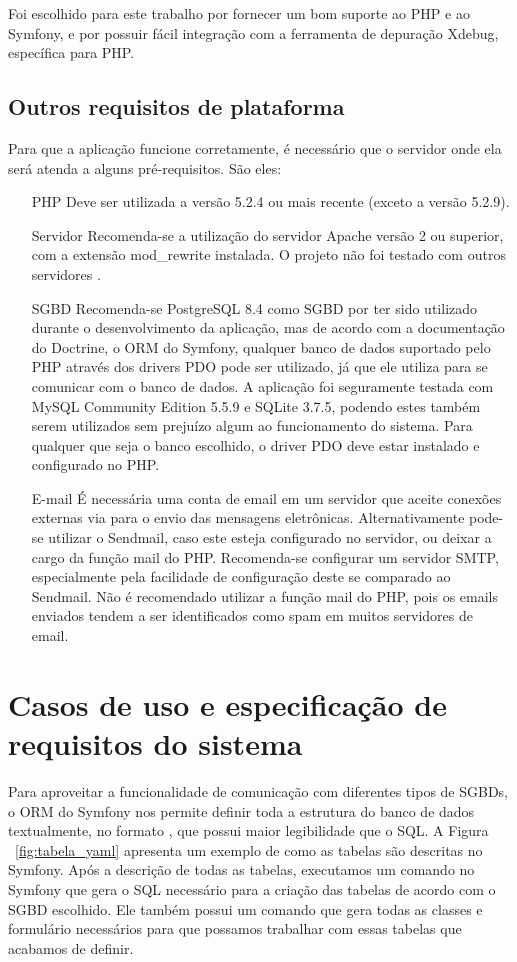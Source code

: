 Foi escolhido para este trabalho por fornecer um bom suporte ao PHP e ao Symfony, e por possuir fácil
integração com a ferramenta de depuração Xdebug, específica para PHP.

\subsection{Outros requisitos de plataforma}
Para que a aplicação funcione corretamente, é necessário que o servidor onde ela será 
atenda a alguns pré-requisitos. São eles:

\begin{itemize}
\item[PHP] Deve ser utilizada a versão 5.2.4 ou mais recente (exceto a versão 5.2.9).
\item[Servidor] Recomenda-se a utilização do servidor Apache versão 2 ou superior, com a extensão
mod\_rewrite instalada. O projeto não foi testado com outros servidores .
\item[SGBD] Recomenda-se PostgreSQL 8.4 como SGBD por ter sido utilizado durante o desenvolvimento da aplicação, mas
de acordo com a documentação do Doctrine, o ORM do Symfony, qualquer banco de dados suportado pelo PHP através 
dos drivers PDO pode ser utilizado, já que ele utiliza  para se comunicar com o banco de dados.
A aplicação foi seguramente testada com MySQL Community Edition 5.5.9 e SQLite 3.7.5, podendo estes 
também serem utilizados sem prejuízo algum ao funcionamento do sistema. Para qualquer que seja o
banco escolhido, o driver PDO deve estar instalado e configurado no PHP.
\item[E-mail] É necessária uma conta de email em um servidor que aceite conexões externas via  para
o envio das mensagens eletrônicas. Alternativamente pode-se utilizar o Sendmail, caso este esteja
configurado no servidor, ou deixar a cargo da função mail do PHP. Recomenda-se configurar um
servidor SMTP, especialmente pela facilidade de configura\-ção deste se comparado ao Sendmail. Não 
é recomendado utilizar a função mail do PHP, pois os emails enviados tendem a ser identificados
como spam em muitos servidores de email.
\end{itemize}

\section{Casos de uso e especificação de requisitos do sistema}
Para aproveitar a funcionalidade de comunicação com diferentes tipos de SGBDs, o ORM
do Symfony nos permite definir toda a estrutura do banco de dados textualmente, no formato
, que possui maior legibilidade que o SQL.
A Figura ~\ref{fig:tabela_yaml} apresenta um exemplo de como as tabelas são descritas no Symfony.
Após a descrição de todas as tabelas, executamos um comando no Symfony que gera o SQL necessário
para a criação das tabelas de acordo com o SGBD escolhido. Ele também possui um comando
que gera todas as classes e formulário necessários para que possamos trabalhar com essas tabelas
que acabamos de definir.

